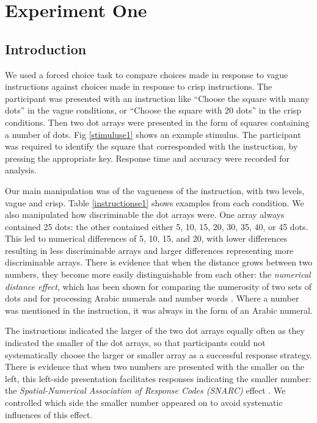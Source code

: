 \documentclass[
a4paper 
, doc
, longtable
]{apa6}
\begin{document}
\section{Experiment One} 

\subsection{Introduction}
We used a forced choice task to compare choices made in response to vague instructions against choices made in response to crisp instructions. The participant was presented with an instruction like ``Choose the square with many dots'' in the vague conditions, or ``Choose the square with 20 dots'' in the crisp conditions. Then two dot arrays were presented in the form of squares containing a number of dots. Fig \ref{stimuluse1} shows an example stimulus. The participant was required to identify the square that corresponded with the instruction, by pressing the appropriate key.
Response time and accuracy were recorded for analysis. 

Our main manipulation was of the vagueness of the instruction, with two levels, vague and crisp. Table \ref{instructionse1} shows examples from each condition.  We also manipulated how discriminable the dot arrays were. One array always contained 25 dots: the other contained either 5, 10, 15, 20, 30, 35, 40, or 45 dots. This led to numerical differences of 5, 10, 15, and 20, with lower differences resulting in less discriminable arrays and larger differences representing more discriminable arrays. There is evidence that when the distance grows between two numbers, they become more easily distinguishable from each other: the \emph{numerical distance effect}, which has been shown for comparing the numerosity of two sets of dots \cite{van123} and for processing Arabic numerals and number words \cite{Dehaene199647}. Where a number was mentioned in the instruction, it was always in the form of an Arabic numeral.

The instructions indicated the larger of the two dot arrays equally often as they indicated the smaller of the dot arrays, so that participants could not systematically choose the larger or smaller array as a successful response strategy. There is evidence that when two numbers are presented with the smaller on the left, this left-side presentation facilitates responses indicating the smaller number: the \emph{Spatial-Numerical Association of Response Codes (SNARC)} effect \cite{dehaene1993mental, gevers2006automatic}. We controlled which side the smaller number appeared on to avoid systematic influences of this effect. 
\end{document}
